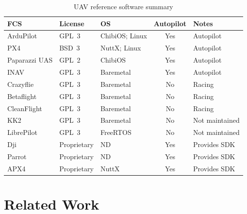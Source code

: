 \begin{table}[t]
  \centering
  \caption{UAV reference software summary}
  \label{tab:sw-ref}

  \begingroup
  \footnotesize
  \setlength{\tabcolsep}{4pt}      %
  \renewcommand{\arraystretch}{1.05}%

  \begin{tabular}{@{} l l l c l @{}}
    \toprule
    \textbf{FCS} & \textbf{License} & \textbf{OS} & \textbf{Autopilot} & \textbf{Notes} \\
    \midrule
    ArduPilot     & GPL~3        & ChibiOS; Linux & Yes & Autopilot \\
    PX4           & BSD~3        & NuttX; Linux   & Yes & Autopilot \\
    Paparazzi UAS & GPL~2        & ChibiOS        & Yes & Autopilot \\
    INAV          & GPL~3        & Baremetal      & Yes & Autopilot \\
    Crazyflie     & GPL~3        & Baremetal      & No  & Racing \\
    Betaflight    & GPL~3        & Baremetal      & No  & Racing \\
    CleanFlight   & GPL~3        & Baremetal      & No  & Racing \\
    KK2           & GPL~3        & Baremetal      & No  & Not maintained \\
    LibrePilot    & GPL~3        & FreeRTOS       & No  & Not maintained \\
    Dji           & Proprietary  & ND             & Yes & Provides SDK \\
    Parrot        & Proprietary  & ND             & Yes & Provides SDK \\
    APX4          & Proprietary  & NuttX          & Yes & Provides SDK \\
    \bottomrule
  \end{tabular}

  \endgroup
\end{table}

\section{Related Work}
\label{sec:related-work}

